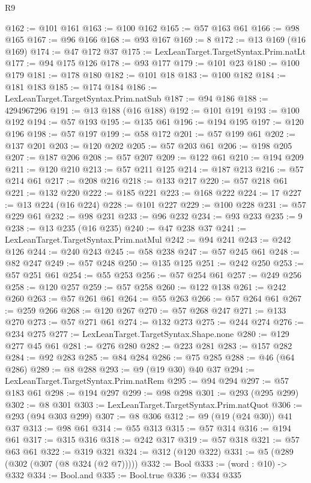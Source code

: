 \begin{lexlean}{R9}
\begin{coremodule}
@162 := @101 @161
@163 := @100 @162
@165 := @57 @163 @61
@166 := @98 @165
@167 := @96 @166
@168 := @93 @167
@169 := 8
@172 := @13 @169 (@16 @169)
@174 := @47 @172 @37
@175 := LexLeanTarget.TargetSyntax.Prim.natLt
@177 := @94 @175 @126
@178 := @93 @177
@179 := @101 @23
@180 := @100 @179
@181 := @178 @180
@182 := @101 @18
@183 := @100 @182
@184 := @181 @183
@185 := @174 @184
@186 := LexLeanTarget.TargetSyntax.Prim.natSub
@187 := @94 @186
@188 := 4294967296
@191 := @13 @188 (@16 @188)
@192 := @101 @191
@193 := @100 @192
@194 := @57 @193
@195 := @135 @61
@196 := @194 @195
@197 := @120 @196
@198 := @57 @197
@199 := @58 @172
@201 := @57 @199 @61
@202 := @137 @201
@203 := @120 @202
@205 := @57 @203 @61
@206 := @198 @205
@207 := @187 @206
@208 := @57 @207
@209 := @122 @61
@210 := @194 @209
@211 := @120 @210
@213 := @57 @211 @125
@214 := @187 @213
@216 := @57 @214 @61
@217 := @208 @216
@218 := @133 @217
@220 := @57 @218 @61
@221 := @132 @220
@222 := @185 @221
@223 := @168 @222
@224 := 17
@227 := @13 @224 (@16 @224)
@228 := @101 @227
@229 := @100 @228
@231 := @57 @229 @61
@232 := @98 @231
@233 := @96 @232
@234 := @93 @233
@235 := 9
@238 := @13 @235 (@16 @235)
@240 := @47 @238 @37
@241 := LexLeanTarget.TargetSyntax.Prim.natMul
@242 := @94 @241
@243 := @242 @126
@244 := @240 @243
@245 := @58 @238
@247 := @57 @245 @61
@248 := @82 @247
@249 := @57 @248
@250 := @135 @125
@251 := @242 @250
@253 := @57 @251 @61
@254 := @55 @253
@256 := @57 @254 @61
@257 := @249 @256
@258 := @120 @257
@259 := @57 @258
@260 := @122 @138
@261 := @242 @260
@263 := @57 @261 @61
@264 := @55 @263
@266 := @57 @264 @61
@267 := @259 @266
@268 := @120 @267
@270 := @57 @268 @247
@271 := @133 @270
@273 := @57 @271 @61
@274 := @132 @273
@275 := @244 @274
@276 := @234 @275
@277 := LexLeanTarget.TargetSyntax.Shape.none
@280 := @129 @277 @45 @61
@281 := @276 @280
@282 := @223 @281
@283 := @157 @282
@284 := @92 @283
@285 := @84 @284
@286 := @75 @285
@288 := @46 (@64 @286)
@289 := @8 @288
@293 := @9 (@19 @30) @40 @37
@294 := LexLeanTarget.TargetSyntax.Prim.natRem
@295 := @94 @294
@297 := @57 @183 @61
@298 := @194 @297
@299 := @98 @298
@301 := @293 (@295 @299)
@302 := @8 @301
@303 := LexLeanTarget.TargetSyntax.Prim.natQuot
@306 := @293 (@94 @303 @299)
@307 := @8 @306
@312 := @9 (@19 (@24 @30)) @41 @37
@313 := @98 @61
@314 := @55 @313
@315 := @57 @314
@316 := @194 @61
@317 := @315 @316
@318 := @242 @317
@319 := @57 @318
@321 := @57 @63 @61
@322 := @319 @321
@324 := @312 (@120 @322)
@331 := @5 (@289 (@302 (@307 (@8 @324 (@2 @7)))))
@332 := Bool
@333 := (word : @10) -> @332
@334 := Bool.and
@335 := Bool.true
@336 := @334 @335

\end{coremodule}
\end{lexlean}
